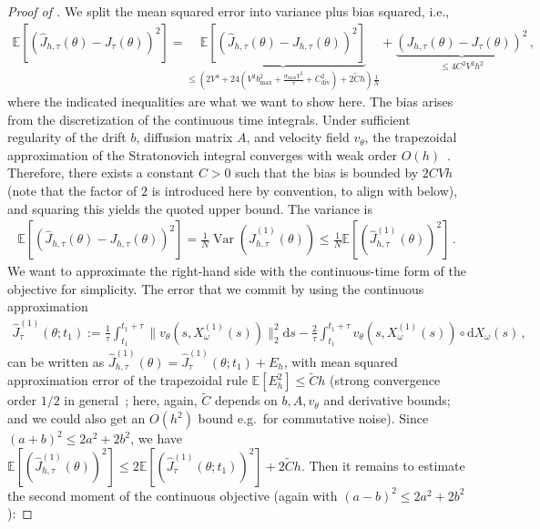 \documentclass[oneside,11pt]{article}
\theoremstyle{remark}
\begin{document}
\begin{proof}[Proof of ]
We split the mean squared error into variance plus bias squared, i.e.,
\begin{align}
\mathbb{E} \left[\left(\widehat{J}_{h,\tau}(\theta) - J_\tau(\theta) \right)^2 \right] = \underbrace{\mathbb{E} \left[\left(\widehat{J}_{h,\tau}(\theta) - J_{h,\tau}(\theta) \right)^2 \right]}_{\leq \left(2 V^4 + 24 \left( V^2 b_{\text{max}}^2 + \frac{\sigma_{\text{max}} V^2}{\tau} + C_{\text{div}}^2 \right) + 2 \tilde{C} h \right) \frac{1}{N} } + \underbrace{\left(J_{h,\tau}(\theta) - J_\tau(\theta) \right)^2}_{\leq 4 C^2 V^2 h^2}\,,
\label{eq:mse-strato}
\end{align}
where the indicated inequalities are what we want to show here. The bias arises from the discretization of the continuous time integrals.  Under sufficient regularity of the drift $b$, diffusion matrix $A$, and velocity field $v_\theta$,
the trapezoidal approximation of the Stratonovich integral converges with weak order $O(h)$~\cite{kloeden-platen:1992}. Therefore, there exists a constant $C > 0$ such that the bias is bounded by $2 C V h$ (note that the factor of $2$ is introduced here by convention, to align with  below), and squaring this yields the quoted upper bound. The variance is
\begin{align}
\mathbb{E} \left[\left(\widehat{J}_{h,\tau}(\theta) - J_{h,\tau}(\theta) \right)^2 \right] = \frac{1}{N} \operatorname{Var}\left( \widehat{J}^{(1)}_{h,\tau}(\theta) \right) \leq \frac{1}{N} \mathbb{E} \left[ \left( \widehat{J}^{(1)}_{h,\tau}(\theta) \right)^2 \right]\,.
\label{eq:var-upper}
\end{align}
We want to approximate the right-hand side with the continuous-time form of the objective for simplicity. The error that we commit by using the continuous approximation
\begin{align*}
\widehat{J}^{(1)}_\tau(\theta;t_1) := \frac{1}{\tau} \int_{t_1}^{t_1+\tau} \lVert v_\theta(s, X_\omega^{(1)}(s)) \rVert_2^2 \mathrm{d}s - \frac{2}{\tau}  \int_{t_1}^{t_1+\tau}  v_\theta(s, X_\omega^{(1)}(s)) \circ \mathrm{d} X_\omega(s)\,,
\end{align*}
can be written as $\widehat{J}^{(1)}_{h,\tau}(\theta) = \widehat{J}_\tau^{(1)}(\theta;t_1) + E_h$, with mean squared approximation error of the trapezoidal rule $\mathbb{E}[E_h^2] \leq \tilde{C} h$ (strong convergence order $1/2$ in general~\cite{kloeden-platen:1992}; here, again, $\tilde{C}$ depends on $b,A,v_\theta$ and derivative bounds; and we could also get an $O(h^2)$ bound e.g.\ for commutative noise). Since $(a+b)^2 \leq 2a^2 + 2b^2$, we have $\mathbb{E}\left[ \left( \widehat{J}^{(1)}_{h,\tau}(\theta) \right)^2 \right] \leq 2 \mathbb{E}\left[ \left( \widehat{J}^{(1)}_\tau(\theta;t_1) \right)^2 \right] + 2 \tilde{C} h$. Then it remains to estimate the second moment of the continuous objective (again with $(a-b)^2 \leq 2 a^2 + 2 b^2$):

\end{proof}
\end{document}
